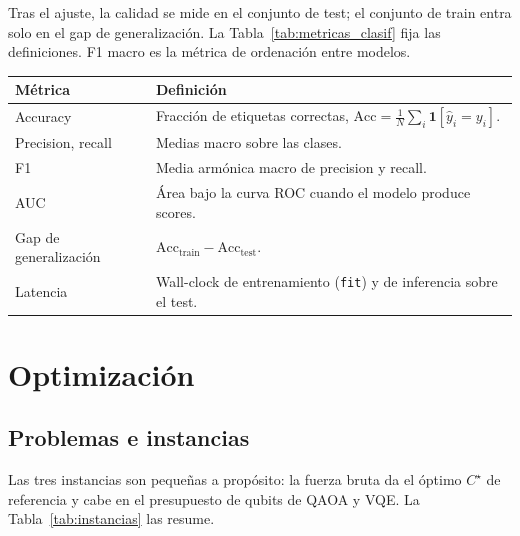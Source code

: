 Tras el ajuste, la calidad se mide en el conjunto de test; el conjunto de train entra solo en el gap de generalización. La Tabla~\ref{tab:metricas_clasif} fija las definiciones. F1 macro es la métrica de ordenación entre modelos.

\par\medskip\noindent\begin{minipage}{\linewidth}
\centering
\small
\begin{tabularx}{\linewidth}{@{}>{\raggedright\arraybackslash}p{3.15cm} >{\raggedright\arraybackslash}X@{}}
\toprule
\textbf{Métrica} & \textbf{Definición} \\
\midrule
Accuracy & Fracción de etiquetas correctas, $\mathrm{Acc}=\frac{1}{N}\sum_i\mathbf{1}[\hat{y}_i=y_i]$. \\
Precision, recall & Medias macro sobre las clases. \\
F1 & Media armónica macro de precision y recall. \\
AUC & Área bajo la curva ROC cuando el modelo produce scores. \\
Gap de generalización & $\mathrm{Acc}_{\mathrm{train}}-\mathrm{Acc}_{\mathrm{test}}$. \\
Latencia & Wall-clock de entrenamiento (\texttt{fit}) y de inferencia sobre el test. \\
\bottomrule
\end{tabularx}
\label{tab:metricas_clasif}
\end{minipage}\par\medskip

\section{Optimización}

\subsection{Problemas e instancias}

Las tres instancias son pequeñas a propósito: la fuerza bruta da el óptimo $C^\star$ de referencia y cabe en el presupuesto de qubits de QAOA y VQE. La Tabla~\ref{tab:instancias} las resume.

